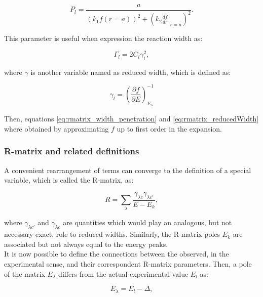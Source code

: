\documentclass[openany]{book}
\begin{document}
\begin{equation}  \label{eq:rmatrix_penetrationFactor}
	P_l = \frac{a}{(k_1 f(r = a ))^2 + \left(k_2 \left.\frac{df}{dr}\right|_{r = a} \right)^2 }.
\end{equation}

This parameter is useful when expression the reaction width as: 

\begin{equation}   \label{eq:rmatrix_width_penetration}
	\Gamma_l = 2C_l\gamma^2_l,
\end{equation}

where $\gamma$ is another variable named as reduced width,  which is defined as: 

\begin{equation}   \label{eq:rmatrix_reducedWidth}
	\gamma_l = \left(\frac{\partial f}{\partial E}\right)^{-1}_{E_\lambda}
\end{equation}


Then, equations \ref{eq:rmatrix_width_penetration} and \ref{eq:rmatrix_reducedWidth}  where obtained by approximating $f$ up to first order in the expansion.\\

\subsubsection{R-matrix and related definitions} \label{ssub:rmatrix_phenomenological_definitions}

A convenient rearrangement of terms can converge to the definition of a special variable, which is called the R-matrix, as: 

\begin{equation}  \label{eq:rmatrix_definition1}
	R= \sum_\lambda {\frac{\gamma_{\lambda c} \gamma_{\lambda c'}}{E - E_k}}, 
\end{equation}

where $\gamma_{\lambda c'} $ and $\gamma_{\lambda c}$ are quantities which would play an analogous, but not necessary exact, role to reduced widths. Similarly, the R-matrix poles $E_k$ are associated but not always equal to the energy peaks. \\

It is now possible to define the connections between the observed, in the experimental sense, and their correspondent R-matrix parameters. Then, a pole of the matrix $E_\lambda$ differs from the actual experimental value $E_l$ as:

\begin{equation}  \label{eq:rmatrix_energyPole}
	E_\lambda =  E_l - \Delta, 
\end{equation}
\end{document}
